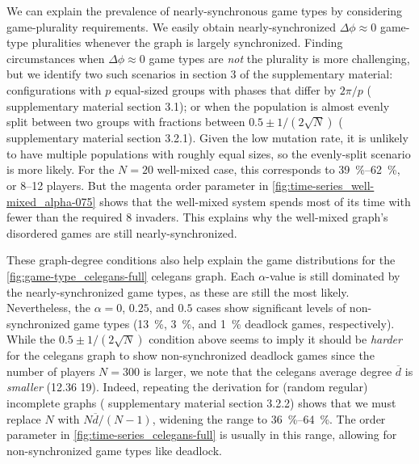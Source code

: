 \documentclass[pdflatex,lineno,referee,sn-nature]{sn-jnl}
\begin{document}
We can explain the prevalence of nearly-synchronous game types
by considering game-plurality requirements.
We easily obtain nearly-synchronized $\Delta \phi \approx 0$
game-type pluralities whenever the graph is largely synchronized.
Finding circumstances when $\Delta \phi \approx 0$ game types
are \emph{not} the plurality is more challenging,
but we identify two such scenarios in section 3 of the supplementary material:
configurations with $p$ equal-sized groups
with phases that differ by $2 \pi/p$ (\cf{} supplementary material section 3.1);
or when the population is almost evenly split between two groups
with fractions between $0.5 \pm 1/(2 \sqrt{N})$
(\cf{} supplementary material section 3.2.1).
Given the low mutation rate, it is unlikely to have
multiple populations with roughly equal sizes,
so the evenly-split scenario is more likely.
For the $N = 20$ well-mixed case, this corresponds
to \SIrange{39}{62}{\percent}, or \numrange{8}{12} players.
But the magenta order parameter in \cref{fig:time-series_well-mixed_alpha-075}
shows that the well-mixed system spends most of its time
with fewer than the required \num{8} invaders.
This explains why the well-mixed graph's disordered games
are still nearly-synchronized.

These graph-degree conditions also help explain the
game distributions for the
\cref{fig:game-type_celegans-full} \gls{celegans} graph.
Each $\alpha$-value is still dominated by the nearly-synchronized
game types, as these are still the most likely.
Nevertheless, the $\alpha = 0$, $0.25$, and $0.5$ cases
show significant levels of non-synchronized game types
(\SI{13}{\percent}, \SI{3}{\percent}, and \SI{1}{\percent} deadlock games,
respectively).
While the $0.5 \pm 1/(2 \sqrt{N})$ condition above seems to imply it
should be \emph{harder} for the \gls{celegans} graph to show
non-synchronized deadlock games since
the number of players $N=300$ is larger,
we note that the \gls{celegans} average degree $\overline{d}$
is \emph{smaller} (\num{12.36} \vs{} \num{19}).
Indeed, repeating the derivation for (random regular) incomplete graphs
(\cf{}  supplementary material section 3.2.2)
shows that we must replace $N$ with $N \overline{d}/(N-1)$,
widening the range to \SIrange{36}{64}{\percent}.
The order parameter in \cref{fig:time-series_celegans-full}
is usually in this range,
allowing for non-synchronized game types like deadlock.
\end{document}
